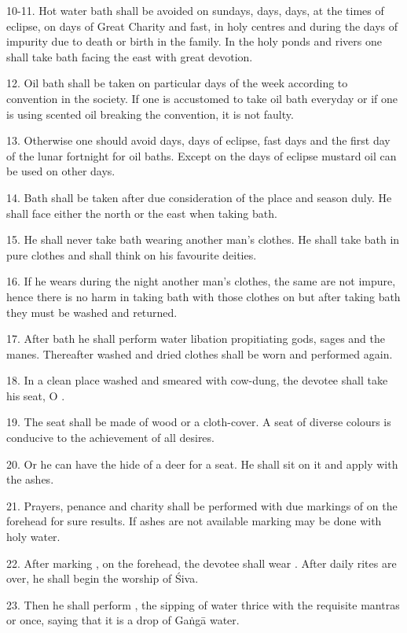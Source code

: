 10-11. Hot water bath shall be avoided on sundays,  days,
 days, at the times of eclipse, on days of Great Charity and fast,
in holy centres and during the days of impurity due to death or birth in
the family. In the holy ponds and rivers one shall take bath facing the east
with great devotion.

12. Oil bath shall be taken on particular days of the week according to
convention in the society. If one is accustomed to take oil bath everyday or if
one is using scented oil breaking the convention, it is not faulty.

13. Otherwise one should avoid  days, days of eclipse, fast days and
the first day of the lunar fortnight for oil baths. Except on the days of
eclipse mustard oil can be used on other days.

14. Bath shall be taken after due consideration of the place and season duly. He
shall face either the north or the east when taking bath.

15. He shall never take bath wearing another man's clothes. He shall take bath
in pure clothes and shall think on his favourite deities.

16. If he wears during the night another man’s clothes, the same are not impure,
hence there is no harm in taking bath with those clothes on but after taking
bath they must be washed and returned.

17. After bath he shall perform water libation propitiating gods, sages and
the manes. Thereafter washed and dried clothes shall be worn and 
performed again.

18. In a clean place washed and smeared with cow-dung, the devotee shall take
his seat, O .

19. The seat shall be made of wood or a cloth-cover. A seat of diverse colours
is conducive to the achievement of all desires.

20. Or he can have the hide of a deer for a seat. He shall sit on it and apply
 with the ashes.

21. Prayers, penance and charity shall be performed with due markings of
 on the forehead for sure results. If ashes are not available
marking may be done with holy water.

22. After marking , on the forehead, the devotee shall wear
. After daily rites are over, he shall begin the worship of Śiva.

23. Then he shall perform , the sipping of water thrice with
the requisite mantras or once, saying that it is a drop of Gaṅgā water.

